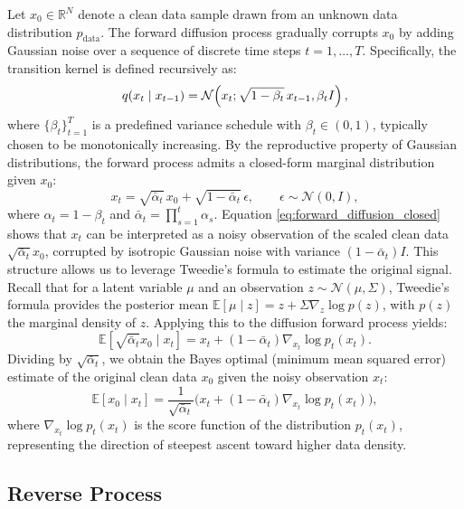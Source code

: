\documentclass[a4paper,11pt]{article}
\renewcommand{\varepsilon}{\epsilon}
\theoremstyle{definition}
\theoremstyle{plain}
\theoremstyle{remark}
\begin{document}
Let $x_0 \in \mathbb{R}^N$ denote a clean data sample drawn from an unknown data distribution $p_{\mathrm{data}}$. The forward diffusion process gradually corrupts $x_0$ by adding Gaussian noise over a sequence of discrete time steps $t = 1,\dots,T$. Specifically, the transition kernel is defined recursively as:
\begin{equation}\notag
    q(x_t \mid x_{t-1}) = \mathcal{N}\!\left(x_t; \sqrt{1-\beta_t}\,x_{t-1}, \beta_t I\right),
\end{equation}
where $\{\beta_t\}_{t=1}^T$ is a predefined variance schedule with $\beta_t \in (0,1)$, typically chosen to be monotonically increasing. 
By the reproductive property of Gaussian distributions, the forward process admits a closed-form marginal distribution given $x_0$:
\begin{equation} \label{eq:forward_diffusion_closed}
    x_t = \sqrt{\bar\alpha_t}\,x_0 + \sqrt{1-\bar\alpha_t}\,\varepsilon, \qquad \varepsilon \sim \mathcal{N}(0,I),
\end{equation}
where $\alpha_t = 1 - \beta_t$ and $\bar\alpha_t = \prod_{s=1}^t \alpha_s$. Equation \eqref{eq:forward_diffusion_closed} shows that $x_t$ can be interpreted as a noisy observation of the scaled clean data $\sqrt{\bar{\alpha}_t} x_0$, corrupted by isotropic Gaussian noise with variance $(1-\bar{\alpha}_t)I$. This structure allows us to leverage Tweedie's formula to estimate the original signal. Recall that for a latent variable $\mu$ and an observation $z \sim \mathcal{N}(\mu, \Sigma)$, Tweedie's formula provides the posterior mean $\mathbb{E}[\mu \mid z] = z + \Sigma \nabla_z \log p(z)$, with $p(z)$ the marginal density of $z$. Applying this to the diffusion forward process yields:
$$\mathbb{E}[\sqrt{\bar{\alpha}_t} x_0 \mid x_t] = x_t + (1-\bar{\alpha}_t)\nabla_{x_t}\log p_t(x_t).$$
Dividing by $\sqrt{\bar{\alpha}_t}$, we obtain the Bayes optimal (minimum mean squared error) estimate of the original clean data $x_0$ given the noisy observation $x_t$:
\begin{equation}
    \label{eq:twed_diff}
    \mathbb{E}[x_0 \mid x_t] = \frac{1}{\sqrt{\bar{\alpha}_t}} \Big( x_t + (1-\bar{\alpha}_t)\nabla_{x_t}\log p_t(x_t) \Big),
\end{equation}
where $\nabla_{x_t} \log p_t(x_t)$ is the score function of the distribution $p_t(x_t)$, representing the direction of steepest ascent toward higher data density.

\subsection{Reverse  Process}
\label{sec:rp}
\end{document}
